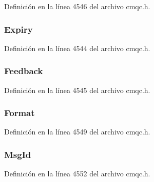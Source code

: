 Definición en la línea 4546 del archivo cmqc.\+h.

\hypertarget{structtag_m_q_m_d1_a85cb54f2f2a97fe071fcad54d22a92a9}{}
\subsubsection[{Expiry}]{ Expiry}\label{structtag_m_q_m_d1_a85cb54f2f2a97fe071fcad54d22a92a9}


Definición en la línea 4544 del archivo cmqc.\+h.

\hypertarget{structtag_m_q_m_d1_a9cb2f407eb097aa9cdc246dc18059987}{}
\subsubsection[{Feedback}]{ Feedback}\label{structtag_m_q_m_d1_a9cb2f407eb097aa9cdc246dc18059987}


Definición en la línea 4545 del archivo cmqc.\+h.

\hypertarget{structtag_m_q_m_d1_a435a478822008713f8aaff89f369ed63}{}
\subsubsection[{Format}]{ Format}\label{structtag_m_q_m_d1_a435a478822008713f8aaff89f369ed63}


Definición en la línea 4549 del archivo cmqc.\+h.

\hypertarget{structtag_m_q_m_d1_a075d401c83d67ca688e6165dda74a44c}{}
\subsubsection[{Msg\+Id}]{ Msg\+Id}\label{structtag_m_q_m_d1_a075d401c83d67ca688e6165dda74a44c}


Definición en la línea 4552 del archivo cmqc.\+h.

